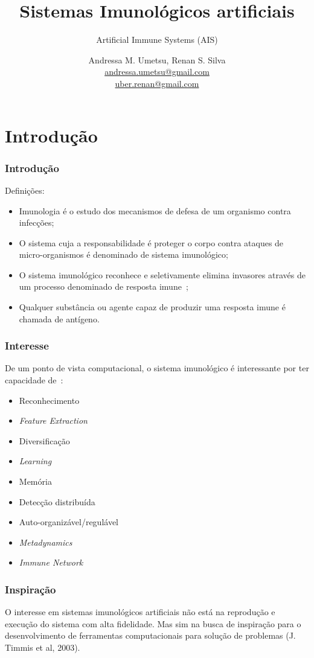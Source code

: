 \documentclass{beamer}
\title[Sistemas Imunológicos artificiais]{Sistemas Imunológicos artificiais}
\subtitle{Artificial Immune Systems (AIS)}
\author[Andressa M. Umetsu, Renan S. Silva]{
    Andressa M. Umetsu, Renan S. Silva\\\medskip
    {\small \url{andressa.umetsu@gmail.com}} \\ 
{\small \url{uber.renan@gmail.com}}}
\institute[UDESC]{
    Departamento de Ci\^encia da Computa\c{c}\~ao \\
    Centro de Ci\^encias Tecnol\'ogicas\\
Universidade do Estado de Santa Catarina}
\begin{document}
\begin{frame}
    \titlepage

\end{frame}

\section{Introdução}
\begin{frame}
    \frametitle{Introdução}
    
    Definições:

    \begin{itemize}
        \item Imunologia é o estudo dos mecanismos de defesa de um organismo contra infecções;
        \item O sistema cuja a responsabilidade é proteger o corpo contra ataques de micro-organismos é denominado de sistema imunológico;
        \item O sistema imunológico reconhece e seletivamente elimina invasores
        através de um processo denominado de resposta imune~\cite{decastro2002};
        \item Qualquer substância ou agente capaz de produzir uma resposta
        imune é chamada de antígeno.
    \end{itemize}
\end{frame}

\begin{frame}
    \frametitle{Interesse}
    De um ponto de vista computacional, o sistema imunológico é interessante por ter capacidade de~\cite{timmis2004}:
    
    \begin{itemize}
        \item Reconhecimento
        \item \textit{Feature Extraction}
        \item Diversificação
        \item \textit{Learning}
        \item Memória
        \item Detecção distribuída
        \item Auto-organizável/regulável
        \item \textit{Metadynamics}
        \item \textit{Immune Network}
    \end{itemize}
\end{frame}

\begin{frame}
    \frametitle{Inspiração}
    
    O interesse em sistemas imunológicos artificiais não está na reprodução
    e execução do sistema com alta fidelidade. 
    Mas sim na busca de inspiração
    para o desenvolvimento de ferramentas computacionais para solução
    de problemas (J. Timmis et al, 2003).
    
\end{frame}
\end{document}

